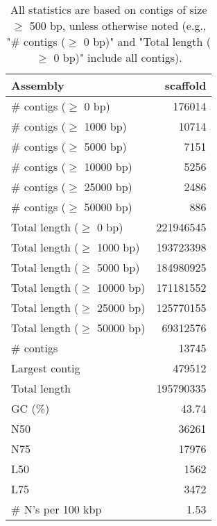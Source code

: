 \documentclass[12pt,a4paper]{article}
\begin{document}
\begin{table}[ht]
\begin{center}
\caption{All statistics are based on contigs of size $\geq$ 500 bp, unless otherwise noted (e.g., "\# contigs ($\geq$ 0 bp)" and "Total length ($\geq$ 0 bp)" include all contigs).}
\begin{tabular}{|l*{1}{|r}|}
\hline
Assembly & scaffold \\ \hline
\# contigs ($\geq$ 0 bp) & 176014 \\ \hline
\# contigs ($\geq$ 1000 bp) & 10714 \\ \hline
\# contigs ($\geq$ 5000 bp) & 7151 \\ \hline
\# contigs ($\geq$ 10000 bp) & 5256 \\ \hline
\# contigs ($\geq$ 25000 bp) & 2486 \\ \hline
\# contigs ($\geq$ 50000 bp) & 886 \\ \hline
Total length ($\geq$ 0 bp) & 221946545 \\ \hline
Total length ($\geq$ 1000 bp) & 193723398 \\ \hline
Total length ($\geq$ 5000 bp) & 184980925 \\ \hline
Total length ($\geq$ 10000 bp) & 171181552 \\ \hline
Total length ($\geq$ 25000 bp) & 125770155 \\ \hline
Total length ($\geq$ 50000 bp) & 69312576 \\ \hline
\# contigs & 13745 \\ \hline
Largest contig & 479512 \\ \hline
Total length & 195790335 \\ \hline
GC (\%) & 43.74 \\ \hline
N50 & 36261 \\ \hline
N75 & 17976 \\ \hline
L50 & 1562 \\ \hline
L75 & 3472 \\ \hline
\# N's per 100 kbp & 1.53 \\ \hline
\end{tabular}
\end{center}
\end{table}
\end{document}
